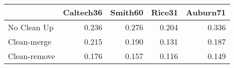 \begin{tabular}{lrrrr}
\toprule
{} & Caltech36 & Smith60 & Rice31 & Auburn71 \\
\midrule
No Clean Up  &     0.236 &   0.276 &  0.204 &    0.336 \\
Clean-merge  &     0.215 &   0.190 &  0.131 &    0.187 \\
Clean-remove &     0.176 &   0.157 &  0.116 &    0.149 \\
\bottomrule
\end{tabular}
